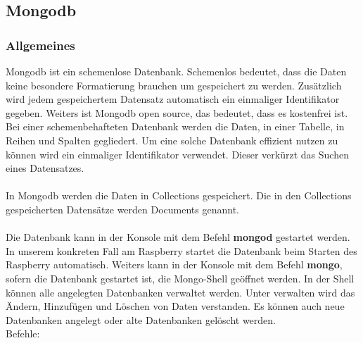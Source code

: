 \subsection{Mongodb}
\subsubsection{Allgemeines}
Mongodb ist ein schemenlose Datenbank. Schemenlos bedeutet, dass die Daten keine besondere Formatierung brauchen um gespeichert zu werden. Zusätzlich wird jedem gespeichertem Datensatz automatisch ein einmaliger Identifikator gegeben. Weiters ist Mongodb open source, das bedeutet, dass es kostenfrei ist.
\\
Bei einer schemenbehafteten Datenbank werden die Daten, in einer Tabelle, in Reihen und Spalten gegliedert. Um eine solche Datenbank effizient nutzen zu können wird ein einmaliger Identifikator verwendet. Dieser verkürzt das Suchen eines Datensatzes.
\\ \\ 
In Mongodb werden die Daten in Collections gespeichert. Die in den Collections gespeicherten Datensätze werden Documents genannt. 
\\ \\
Die Datenbank kann in der Konsole mit dem Befehl \textbf{mongod} gestartet werden. In unserem konkreten Fall am Raspberry startet die Datenbank beim Starten des Raspberry automatisch. Weiters kann in der Konsole mit dem Befehl \textbf{mongo}, sofern die Datenbank gestartet ist, die Mongo-Shell geöffnet werden. In der Shell können alle angelegten Datenbanken verwaltet werden. Unter verwalten wird das Ändern, Hinzufügen und Löschen von Daten verstanden. Es können auch neue Datenbanken angelegt oder alte Datenbanken gelöscht werden. 
\\ Befehle:
